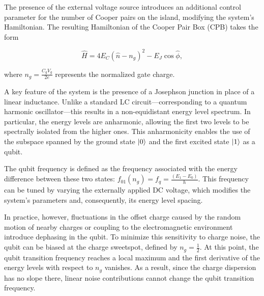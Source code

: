 The presence of the external voltage source introduces an additional control parameter for the number of Cooper pairs on the island, modifying the system's Hamiltonian. 
The resulting Hamiltonian of the Cooper Pair Box (CPB) takes the form

\begin{equation}\label{eq:CPB_complete}
    \hat{H} = 4E_C(\hat{n} - n_g)^2 - E_J \cos{\hat{\phi}},
\end{equation}

where $n_g = \frac{C_g V_g}{2e}$ represents the normalized gate charge.

A key feature of the system is the presence of a Josephson junction in place of a linear inductance. 
Unlike a standard LC circuit—corresponding to a quantum harmonic oscillator—this results in a non-equidistant energy level spectrum. 
In particular, the energy levels are anharmonic, allowing the first two levels to be spectrally isolated from the higher ones. 
This anharmonicity enables the use of the subspace spanned by the ground state $\ket{0}$ and the first excited state $\ket{1}$ as a qubit.

The qubit frequency is defined as the frequency associated with the energy difference between these two states: $f_{01}(n_g) = f_q = \frac{(E_1 - E_0)}{h}$.
This frequency can be tuned by varying the externally applied DC voltage, which modifies the system’s parameters and, consequently, its energy level spacing.

In practice, however, fluctuations in the offset charge caused by the random motion of nearby charges or coupling to the electromagnetic environment introduce dephasing in the qubit. 
To minimize this sensitivity to charge noise, the qubit can be biased at the charge sweetspot, defined by $n_g=\frac{1}{2}$.
At this point, the qubit transition frequency reaches a local maximum and the first derivative of the energy levels with respect to $n_g$ vanishes.
As a result, since the charge dispersion has no slope there, linear noise contributions cannot change the qubit transition frequency.


